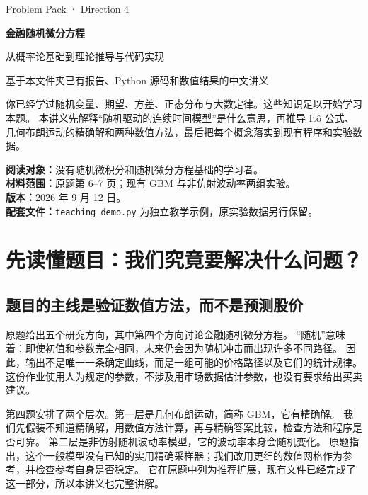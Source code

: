 \documentclass[11pt,a4paper,fontset=none]{ctexart}
\numberwithin{equation}{section}
\begin{document}
\hypersetup{pageanchor=false}
\begin{titlepage}
\vspace*{20mm}
{\sffamily\color{accent}\large Problem Pack · Direction 4\par}
\vspace{8mm}
{\sffamily\bfseries\Huge 金融随机微分方程\par}
\vspace{5mm}
{\sffamily\LARGE 从概率论基础到理论推导与代码实现\par}
\vspace{12mm}
{\large 基于本文件夹已有报告、Python 源码和数值结果的中文讲义\par}
\vspace{12mm}
\noindent\begin{minipage}{.93\textwidth}
你已经学过随机变量、期望、方差、正态分布与大数定律。这些知识足以开始学习本题。
本讲义先解释“随机驱动的连续时间模型”是什么意思，再推导 Itô 公式、几何布朗运动的精确解和两种数值方法，最后把每个概念落实到现有程序和实验数据。
\end{minipage}
\vfill
\noindent\textbf{阅读对象：}没有随机微积分和随机微分方程基础的学习者。\\[4pt]
\textbf{材料范围：}原题第 6--7 页；现有 GBM 与非仿射波动率两组实验。\\[4pt]
\textbf{版本：}2026 年 9 月 12 日。\\[4pt]
\textbf{配套文件：}\texttt{teaching\_demo.py} 为独立教学示例，原实验数据另行保留。
\end{titlepage}
\hypersetup{pageanchor=true}
\tableofcontents
\clearpage
{}

\section{先读懂题目：我们究竟要解决什么问题？}\label{sec:question}
\subsection{题目的主线是验证数值方法，而不是预测股价}
原题给出五个研究方向，其中第四个方向讨论金融随机微分方程\cite{pack}。
“随机”意味着：即使初值和参数完全相同，未来仍会因为随机冲击而出现许多不同路径。
因此，输出不是唯一一条确定曲线，而是一组可能的价格路径以及它们的统计规律。
这份作业使用人为规定的参数，不涉及用市场数据估计参数，也没有要求给出买卖建议。

第四题安排了两个层次。第一层是几何布朗运动，简称 GBM，它有精确解。
我们先假装不知道精确解，用数值方法计算，再与精确答案比较，检查方法和程序是否可靠。
第二层是非仿射随机波动率模型，它的波动率本身会随机变化。
原题指出，这个一般模型没有已知的实用精确采样器；我们改用更细的数值网格作为参考，并检查参考自身是否稳定。
它在原题中列为推荐扩展，现有文件已经完成了这一部分，所以本讲义也完整讲解。
\end{document}
